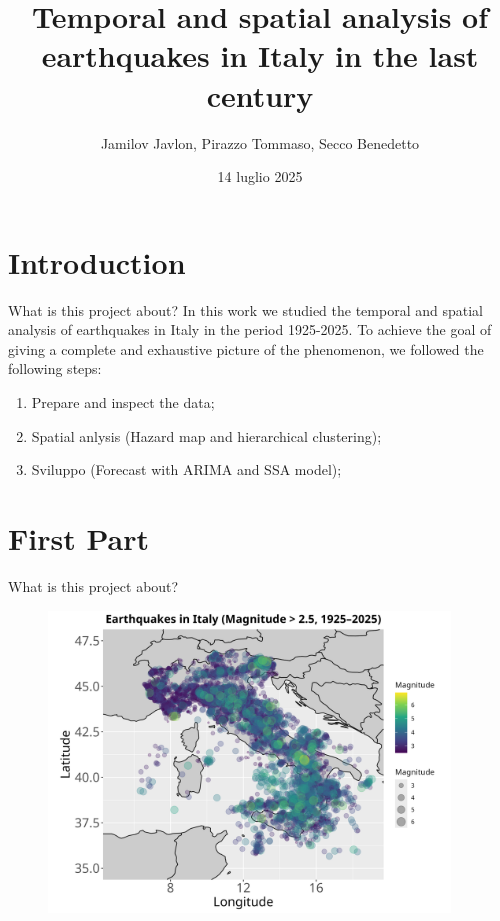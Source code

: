 \documentclass[aspectratio=43]{beamer}
\title{Temporal and spatial analysis of earthquakes in Italy in the last century\\}
\subtitle{}
\author[]{Jamilov Javlon, Pirazzo Tommaso, Secco Benedetto}
\date{14 luglio 2025}
\begin{document}
\frame{\titlepage}

\section{Introduction}

\begin{frame}{What is this project about?}
	In this work we studied the temporal and spatial analysis of earthquakes in Italy in the period 1925-2025. 
	To achieve the goal of giving a complete and exhaustive picture of the phenomenon, we followed the following steps:\pause
	
	\vspace*{1cm}
	
	\begin{enumerate}
		\item Prepare and inspect the data;\pause
			\vspace*{0.5cm}
		\item Spatial anlysis (Hazard map and hierarchical clustering);\pause
			\vspace*{0.5cm}
		\item Sviluppo (Forecast with ARIMA and SSA model);\pause
	\end{enumerate}
\end{frame}


\section{First Part}

\begin{frame}{What is this project about?}
	\begin{figure}[h]
		\centering
		\includegraphics[width=0.95\textwidth]{EQ_images/all_earthquakes.png}
	\end{figure}
\end{frame}
\end{document}
